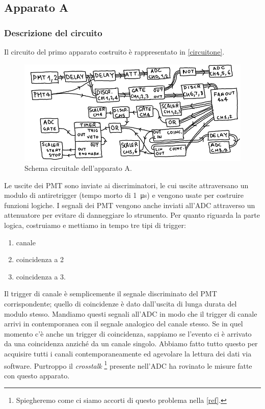 \subsection{Apparato A}


\subsubsection{Descrizione del circuito}

Il circuito del primo apparato costruito è rappresentato in \autoref{circuitone}.

\begin{figure}[h]
\centering
\includegraphics[width=30 em]{immagini/circuitone}
\caption{Schema circuitale dell'apparato A.}
\label{circuitone}
\end{figure}

Le uscite dei PMT sono inviate ai discriminatori, le cui uscite attraversano un modulo di antiretrigger (tempo morto di \SI{1}{\micro s}) e vengono usate per costruire funzioni logiche. I segnali dei PMT vengono anche inviati all'ADC attraverso un attenuatore per evitare di danneggiare lo strumento.
Per quanto riguarda la parte logica, costruiamo e mettiamo in tempo tre tipi di trigger:
\begin{enumerate}
\item canale
\item coincidenza a 2
\item coincidenza a 3.
\end{enumerate}
Il trigger di canale è semplicemente il segnale discriminato del PMT corrispondente; quello di coincidenze è dato dall'uscita di lunga durata del modulo stesso. Mandiamo questi segnali all'ADC in modo che il trigger di canale arrivi in contemporanea con il segnale analogico del canale stesso. Se in quel momento c'è anche un trigger di coincidenza, sappiamo se l'evento ci è arrivato da una coincidenza anziché da un canale singolo. Abbiamo fatto tutto questo per acquisire tutti i canali contemporaneamente ed agevolare la lettura dei dati via software. Purtroppo il \emph{crosstalk}%
\footnote{Spiegheremo come ci siamo accorti di questo problema nella \autoref{ref}.} presente nell'ADC ha rovinato le misure fatte con questo apparato.

